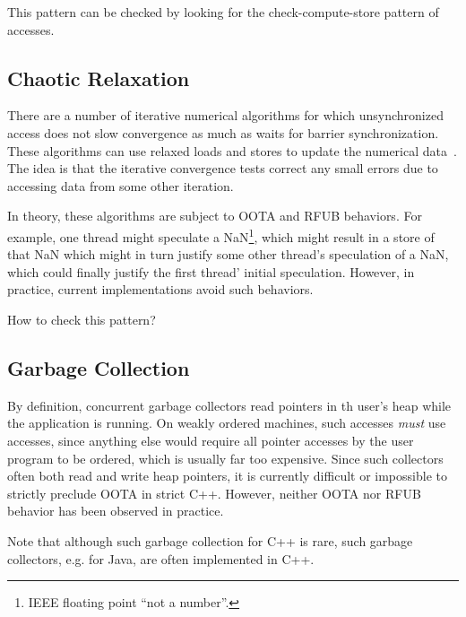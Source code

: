 \documentclass[10]{article}
\begin{document}
This pattern can be checked by looking for the check-compute-store
pattern of accesses.

\subsection{Chaotic Relaxation}
\label{sec:Chaotic Relaxation}

There are a number of iterative numerical algorithms for which unsynchronized
access does not slow convergence as much as waits for barrier synchronization.
These algorithms can use relaxed loads and stores to update the numerical
data~\cite{Andrews91textbook}.
The idea is that the iterative convergence tests correct any small errors
due to accessing data from some other iteration.

In theory, these algorithms are subject to OOTA and RFUB behaviors.
For example, one thread might speculate a NaN\footnote{
	IEEE floating point ``not a number''.},
which might result in a store of that NaN which might in turn justify
some other thread's speculation of a NaN, which could finally justify
the first thread' initial speculation.
However, in practice, current implementations avoid such behaviors.

How to check this pattern?

\subsection{Garbage Collection}
\label{sec:Garbage Collection}

By definition, concurrent garbage collectors read pointers in th
user's heap while the application is running.
On weakly ordered machines, such accesses {\it must} use
 accesses, since anything else would require
all pointer accesses by the user program to be ordered, which is usually
far too expensive.
Since such collectors often both read and write heap pointers, it is
currently difficult or impossible to strictly preclude OOTA in strict C++.
However, neither OOTA nor RFUB behavior has been observed in practice.

Note that although such garbage collection for C++ is rare, such garbage
collectors, e.g. for Java, are often implemented in C++.

\end{document}
